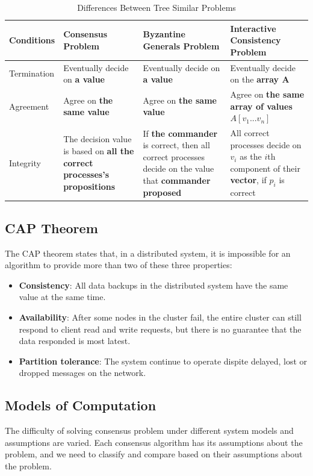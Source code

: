 \documentclass[12pt, a4paper]{article}
\begin{document}
\begin{table}[htp]
\centering
\begin{tabular}{|l|p{3.5cm}|p{3.5cm}|p{3.5cm}|}
\hline
Conditions  & Consensus Problem & Byzantine Generals Problem& Interactive Consistency Problem \\ \hline
Termination & Eventually decide on \textbf{a value} & Eventually decide on \textbf{a value} & Eventually decide on the \textbf{array A} \\ \hline
Agreement   & Agree on \textbf{the same value} & Agree on \textbf{the same value} & Agree on \textbf{the same array of values $A[v_{1}...v_{n}]$} \\ \hline
Integrity 	& The decision value is based on \textbf{all the correct processes's propositions} &  If \textbf{the commander} is correct, then all correct processes decide on the value that \textbf{commander proposed} & All correct processes decide on $v_{i}$ as the ${i}$th component of their \textbf{vector}, if $p_{i}$ is correct \\ \hline
\end{tabular}
\caption{Differences Between Tree Similar Problems}
\label{tab:dbtap}
\end{table}

\subsection{CAP Theorem}
The CAP theorem \cite{brewer2012cap} states that, in a distributed system, it is impossible for an algorithm to provide more than two of these three properties:
\begin{itemize}
	\item \textbf{Consistency}: All data backups in the distributed system have the same value at the same time.
	\item \textbf{Availability}: After some nodes in the cluster fail, the entire cluster can still respond to client read and write requests, but there is no guarantee that the data responded is most latest.
	\item \textbf{Partition tolerance}: The system continue to operate dispite delayed, lost or dropped messages on the network.  
\end{itemize}

\subsection{Models of Computation}
The difficulty of solving consensus problem under different system models and assumptions are varied. Each consensus algorithm has its assumptions about the problem, and we need to classify and compare based on their assumptions about the problem.
\end{document}
